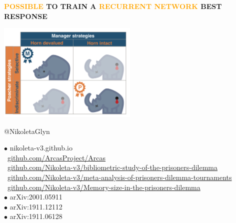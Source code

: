 \documentclass{beamer}
\begin{document}
\begin{frame}
    \begin{center}
    \Large{\textbf{\textcolor{orange}{POSSIBLE} TO TRAIN A \textcolor{orange}{RECURRENT NETWORK} BEST RESPONSE}} \\
    \end{center}
\end{frame}

\begin{frame}
    \begin{center}
    \includegraphics[width=0.5\textwidth]{static/RhinoPic.pdf}\hspace{12pt}
     \\
    \end{center}
\end{frame}

\begin{frame}
    \begin{center}
    \faTwitter @NikoletaGlyn \\
    
    \vspace{1cm}
    \end{center}

    \footnotesize
    $\bullet$ nikoleta-v3.github.io \\
    \faGithub \ \url{github.com/ArcasProject/Arcas} \\
    \faGithub \ \url{github.com/Nikoleta-v3/bibliometric-study-of-the-prisoners-dilemma} \\
    \faGithub \ \url{github.com/Nikoleta-v3/meta-analysis-of-prisoners-dilemma-tournaments} \\
    \faGithub \ \url{github.com/Nikoleta-v3/Memory-size-in-the-prisoners-dilemma} \\
    $\bullet$ arXiv:2001.05911 \\
    $\bullet$ arXiv:1911.12112 \\
    $\bullet$ arXiv:1911.06128 \\
\end{frame}
\end{document}
